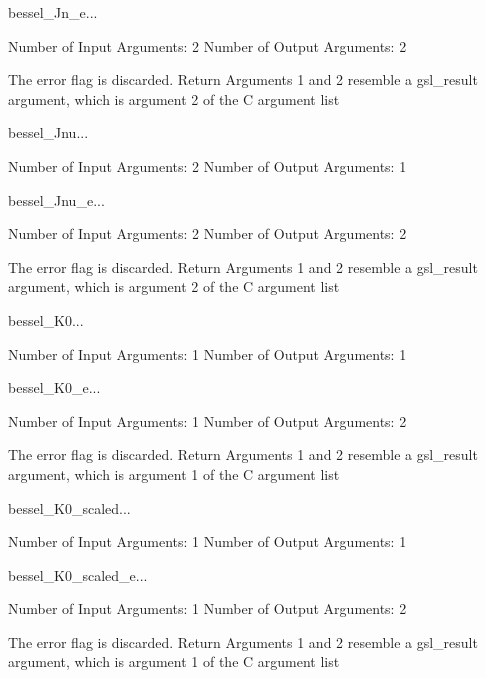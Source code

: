 \begin{funcdesc}{bessel_Jn_e}{...}

    Number of Input  Arguments:  2
    Number of Output Arguments:  2

The error flag is discarded.
Return Arguments 1 and 2 resemble a gsl_result argument,
	which is  argument 2 of the C argument list

\end{funcdesc}

\begin{funcdesc}{bessel_Jnu}{...}

    Number of Input  Arguments:  2
    Number of Output Arguments:  1
\end{funcdesc}

\begin{funcdesc}{bessel_Jnu_e}{...}

    Number of Input  Arguments:  2
    Number of Output Arguments:  2

The error flag is discarded.
Return Arguments 1 and 2 resemble a gsl_result argument,
	which is  argument 2 of the C argument list

\end{funcdesc}

\begin{funcdesc}{bessel_K0}{...}

    Number of Input  Arguments:  1
    Number of Output Arguments:  1
\end{funcdesc}

\begin{funcdesc}{bessel_K0_e}{...}

    Number of Input  Arguments:  1
    Number of Output Arguments:  2

The error flag is discarded.
Return Arguments 1 and 2 resemble a gsl_result argument,
	which is  argument 1 of the C argument list

\end{funcdesc}

\begin{funcdesc}{bessel_K0_scaled}{...}

    Number of Input  Arguments:  1
    Number of Output Arguments:  1
\end{funcdesc}

\begin{funcdesc}{bessel_K0_scaled_e}{...}

    Number of Input  Arguments:  1
    Number of Output Arguments:  2

The error flag is discarded.
Return Arguments 1 and 2 resemble a gsl_result argument,
	which is  argument 1 of the C argument list

\end{funcdesc}

